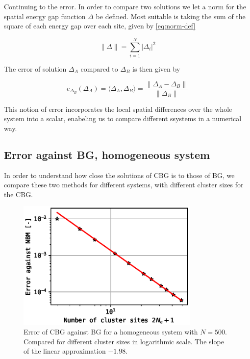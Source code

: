 \documentclass[11pt]{article}
\begin{document}
Continuing to the error. In order to compare two solutions we let a norm for the spatial energy gap function $\Delta$ be defined. Most suitable is taking the sum of the square of each energy gap over each site, given by \eqref{eq:norm-def}

\begin{equation} \label{eq:norm-def}
  \lVert \Delta \rVert = \sum_{i=1}^{N} \lvert \Delta_i \rvert ^2
\end{equation}

The error of solution $\Delta_A$ compared to $\Delta_B$ is then given by

\begin{equation}\label{eq:err}
  e_{\Delta_B}(\Delta_A) = \langle \Delta_A, \Delta_B \rangle = \frac{\lVert \Delta_A - \Delta_B \rVert}{\lVert \Delta_B \rVert }
\end{equation}

This notion of error incorporates the local spatial differences over the whole system into a scalar, enabeling us to compare different ssystems in a numerical way. 

\subsection{Error against BG, homogeneous system} %
\label{sub:error_against_nbm}

In order to understand how close the solutions of CBG  is to those of BG, we compare these two methods for different systems, with different cluster sizes for the CBG. 

\begin{figure}[ht!]
	\centering
	\includegraphics[width=0.8\textwidth]{figures/one_sys_err.eps}
	\caption{Error of CBG against BG for a homogeneous system with $N=500$. Compared for different cluster sizes in logarithmic scale. The slope of the linear approximation $-1.98$. }
	\label{fig:err_single_system}
\end{figure}
\end{document}
